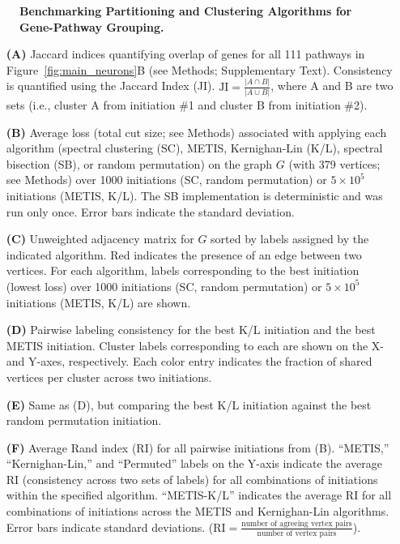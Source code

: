\documentclass[12pt]{article}
\begin{document}
\begin{figure}[H]
\begin{subfigure}[t]{0.33\textwidth}
    \end{subfigure}
    \caption{
        \textbf{Benchmarking Partitioning and Clustering Algorithms for Gene-Pathway Grouping.}\\
    }
    \label{fig:benchmarking_clustering}
\end{figure}
\begin{itemize}
    \item[\textbf{(A)}] Jaccard indices quantifying overlap of genes for all 111 pathways in Figure~\ref{fig:main_neurons}B (see Methods; Supplementary Text). Consistency is quantified using the Jaccard Index (JI). $\text{JI} = \frac{|A \cap B|}{|A \cup B|}$, where A and B are two sets (i.e., cluster A from initiation \#1 and cluster B from initiation \#2).
    \item[\textbf{(B)}] Average loss (total cut size; see Methods) associated with applying each algorithm (spectral clustering (SC), METIS, Kernighan-Lin (K/L), spectral bisection (SB), or random permutation) on the graph $G$ (with 379 vertices; see Methods) over 1000 initiations (SC, random permutation) or $5 \times 10^5$ initiations (METIS, K/L). The SB implementation is deterministic and was run only once. Error bars indicate the standard deviation. 
    \item[\textbf{(C)}] Unweighted adjacency matrix for $G$ sorted by labels assigned by the indicated algorithm. Red indicates the presence of an edge between two vertices. For each algorithm, labels corresponding to the best initiation (lowest loss) over 1000 initiations (SC, random permutation) or $5 \times 10^5$ initiations (METIS, K/L) are shown. 
    \item[\textbf{(D)}] Pairwise labeling consistency for the best K/L initiation and the best METIS initiation. Cluster labels corresponding to each are shown on the X- and Y-axes, respectively. Each color entry indicates the fraction of shared vertices per cluster across two initiations. 
    \item[\textbf{(E)}] Same as (D), but comparing the best K/L initiation against the best random permutation initiation. 
    \item[\textbf{(F)}] Average Rand index (RI) for all pairwise initiations from (B). “METIS,” “Kernighan-Lin,” and “Permuted” labels on the Y-axis indicate the average RI (consistency across two sets of labels) for all combinations of initiations within the specified algorithm. “METIS-K/L” indicates the average RI for all combinations of initiations across the METIS and Kernighan-Lin algorithms. Error bars indicate standard deviations. ($\text{RI} = \frac{\text{number of agreeing vertex pairs}}{\text{number of vertex pairs}}$).
\end{itemize} \clearpage
\end{document}
